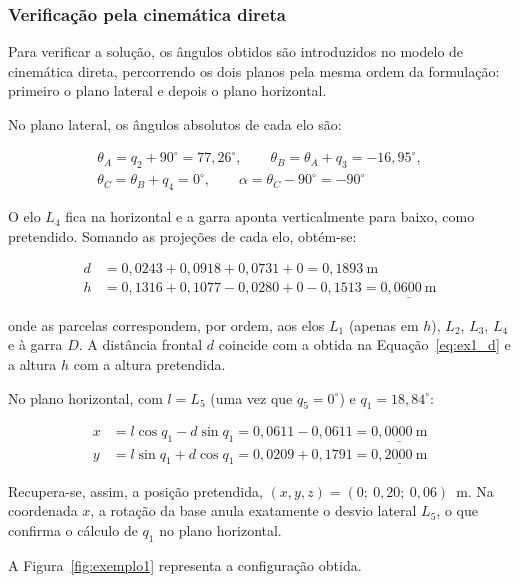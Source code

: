 \subsubsection*{Verificação pela cinemática direta}

Para verificar a solução, os ângulos obtidos são introduzidos no modelo de cinemática direta, percorrendo os dois planos pela mesma ordem da formulação: primeiro o plano lateral e depois o plano horizontal.

No plano lateral, os ângulos absolutos de cada elo são:

\begin{equation}
    \begin{gathered}
    \theta_A=q_2+90^\circ=77{,}26^\circ,\qquad
    \theta_B=\theta_A+q_3=-16{,}95^\circ,\\
    \theta_C=\theta_B+q_4=0^\circ,\qquad
    \alpha=\theta_C-90^\circ=-90^\circ
    \end{gathered}
\end{equation}

O elo $L_4$ fica na horizontal e a garra aponta verticalmente para baixo, como pretendido. Somando as projeções de cada elo, obtém-se:

\begin{align}
    d&=0{,}0243+0{,}0918+0{,}0731+0=0{,}1893\ \text{m}\\
    h&=0{,}1316+0{,}1077-0{,}0280+0-0{,}1513=\underline{0{,}0600\ \text{m}}
\end{align}

onde as parcelas correspondem, por ordem, aos elos $L_1$ (apenas em $h$), $L_2$, $L_3$, $L_4$ e à garra $D$. A distância frontal $d$ coincide com a obtida na Equação~\eqref{eq:ex1_d} e a altura $h$ com a altura pretendida.

No plano horizontal, com $l=L_5$ (uma vez que $q_5=0^\circ$) e $q_1=18{,}84^\circ$:

\begin{align}
    x&=l\cos q_1-d\sin q_1=0{,}0611-0{,}0611=\underline{0{,}0000\ \text{m}}\\
    y&=l\sin q_1+d\cos q_1=0{,}0209+0{,}1791=\underline{0{,}2000\ \text{m}}
\end{align}

Recupera-se, assim, a posição pretendida, $(x,y,z)=(0;\ 0{,}20;\ 0{,}06)$~m. Na coordenada $x$, a rotação da base anula exatamente o desvio lateral $L_5$, o que confirma o cálculo de $q_1$ no plano horizontal.

A Figura~\ref{fig:exemplo1} representa a configuração obtida.

